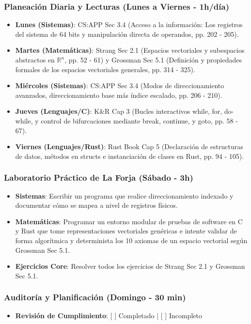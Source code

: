 \documentclass[11pt, a4paper]{article}
\begin{document}
\subsubsection{Planeación Diaria y Lecturas (Lunes a Viernes - 1h/día)}
\begin{itemize}
    \item \textbf{Lunes (Sistemas)}: CS:APP Sec 3.4 (Acceso a la información: Los registros del sistema de 64 bits y manipulación directa de operandos, pp. 202 - 205).
    \item \textbf{Martes (Matemáticas)}: Strang Sec 2.1 (Espacios vectoriales y subespacios abstractos en $\mathbb{R}^n$, pp. 52 - 61) y Grossman Sec 5.1 (Definición y propiedades formales de los espacios vectoriales generales, pp. 314 - 325).
    \item \textbf{Miércoles (Sistemas)}: CS:APP Sec 3.4 (Modos de direccionamiento avanzados, direccionamiento base más índice escalado, pp. 206 - 210).
    \item \textbf{Jueves (Lenguajes/C)}: K\&R Cap 3 (Bucles interactivos while, for, do-while, y control de bifurcaciones mediante break, continue, y goto, pp. 58 - 67).
    \item \textbf{Viernes (Lenguajes/Rust)}: Rust Book Cap 5 (Declaración de estructuras de datos, métodos en structs e instanciación de clases en Rust, pp. 94 - 105).
\end{itemize}

\subsubsection{Laboratorio Práctico de La Forja (Sábado - 3h)}
\begin{itemize}
    \item \textbf{Sistemas}: Escribir un programa que realice direccionamiento indexado y documentar cómo se mapea a nivel de registros físicos.
    \item \textbf{Matemáticas}: Programar un entorno modular de pruebas de software en C y Rust que tome representaciones vectoriales genéricas e intente validar de forma algorítmica y determinista los 10 axiomas de un espacio vectorial según Grossman Sec 5.1.
    \item \textbf{Ejercicios Core}: Resolver todos los ejercicios de Strang Sec 2.1 y Grossman Sec 5.1.
\end{itemize}

\subsubsection{Auditoría y Planificación (Domingo - 30 min)}
\begin{itemize}
    \item \textbf{Revisión de Cumplimiento}: [ ] Completado | [ ] Incompleto
\end{itemize}
\end{document}
